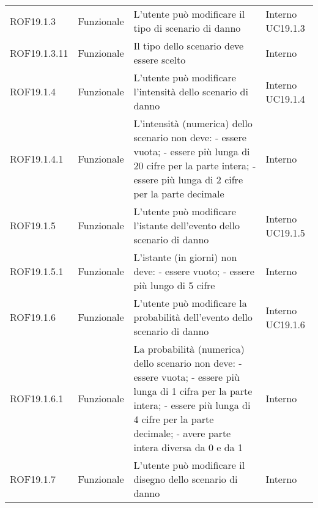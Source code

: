 \begin{longtable}{p{2cm}!{\VRule[1pt]}p{2cm}!{\VRule[1pt]}p{5cm}!{\VRule[1pt]}p{1.5cm}}
	ROF19.1.3                        & Funzionale\newline               & L'utente può modificare il tipo di scenario di danno                                                                     & Interno \newline UC19.1.3    
	\\
	ROF19.1.3.11                     & Funzionale\newline               & Il tipo dello scenario deve essere scelto                                                                                 & Interno                      \\
	ROF19.1.4                        & Funzionale\newline               & L'utente può modificare l'intensità  dello scenario di danno                                                            & Interno \newline UC19.1.4    
	\\
	ROF19.1.4.1&Funzionale\newline  & L'intensità (numerica) dello scenario non deve:
	- essere vuota;
	- essere più lunga di 20 cifre per la
	parte intera; 
	- essere più lunga di 2 cifre per la parte decimale & Interno \\
	ROF19.1.5                        & Funzionale\newline               & L'utente può modificare l'istante dell'evento dello scenario di danno                                                    & Interno \newline UC19.1.5    
	\\
	ROF19.1.5.1&Funzionale\newline  & L'istante (in giorni) non deve:
	- essere vuoto;
	- essere più lungo di 5 cifre & Interno \\
	ROF19.1.6                        & Funzionale\newline               & L'utente può modificare la probabilità  dell'evento dello scenario di danno                                             & Interno \newline UC19.1.6    
	\\
	ROF19.1.6.1&Funzionale\newline  & La probabilità (numerica) dello scenario non deve:
	- essere vuota;
	- essere più lunga di 1 cifra per la parte intera; 
	- essere più lunga di 4 cifre per la parte decimale;
	- avere parte intera diversa da 0 e da 1 & Interno \\
	ROF19.1.7                        & Funzionale\newline               & L'utente può modificare il disegno dello scenario di danno                                                               & Interno                      \\

\end{longtable}
